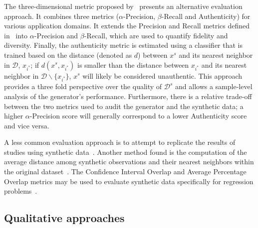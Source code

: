 \documentclass[parskip=full]{scrartcl}
\begin{document}
The three-dimensional metric proposed by~\citet{alaa2022faithful} presents an
alternative evaluation approach. It combines three metrics
($\alpha$-Precision, $\beta$-Recall and Authenticity) for various application
domains. It extends the Precision and Recall metrics defined
in~\cite{sajjadi2018assessing} into $\alpha$-Precision and $\beta$-Recall,
which are used to quantify fidelity and diversity. Finally, the authenticity
metric is estimated using a classifier that is trained based on the distance
(denoted as $d$) between $x^s$ and its nearest neighbor in $\mathcal{D}$,
$x_{i^*}$; if $d(x^s, x_{i^*})$ is smaller than the distance between $x_{i^*}$
and its nearest neighbor in $\mathcal{D}\backslash \{x_{i^*}\}$, $x^s$ will
likely be considered unauthentic. This approach provides a three fold
perspective over the quality of $\mathcal{D}^s$ and allows a sample-level
analysis of the generator's performance. Furthermore, there is a relative
trade-off between the two metrics used to audit the generator and the
synthetic data; a higher $\alpha$-Precision score will generally correspond to
a lower Authenticity score and vice versa.

A less common evaluation approach is to attempt to replicate the results of
studies using synthetic data~\cite{el2020seven, benaim2020analyzing,
rosenblatt2022epistemic}. Another method found is the computation of the
average distance among synthetic observations and their nearest neighbors
within the original dataset~\cite{hittmeir2019utility}. The Confidence
Interval Overlap and Average Percentage Overlap metrics may be used to
evaluate synthetic data specifically for regression
problems~\cite{khan2022utility, karr2006framework}.



% 
% 

\subsection{Qualitative approaches}
\end{document}
